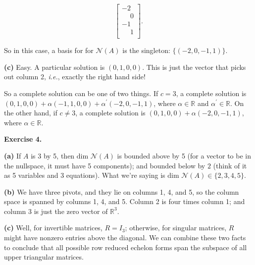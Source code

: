 \documentclass{article}
\begin{document}
\[
\begin{bmatrix}
-2\\
\phantom{-}0\\
-1\\
\phantom{-}1\\
\end{bmatrix}.
\]

So in this case, a basis for for $\mathcal{N}(A)$ is the singleton: $\{(-2, 0, -1, 1)\}$.

\noindent \textbf{(c)} Easy. A particular solution is $(0, 1, 0, 0)$. This is just the vector that picks out column 2, \textit{i.e.}, exactly the right hand side!

So a complete solution can be one of two things. If $c = 3$, a complete solution is $(0, 1, 0, 0) + \alpha (-1, 1, 0, 0) + \alpha^{\prime} (-2, 0, -1, 1)$, where $\alpha \in \mathbb{R}$ and $\alpha^{\prime} \in \mathbb{R}$. On the other hand, if $c \neq 3$, a complete solution is $(0, 1, 0, 0) + \alpha (-2, 0, -1, 1)$, where $\alpha \in \mathbb{R}$.

\noindent \textbf{Exercise 4.}

\noindent \textbf{(a)} If $A$ is 3 by 5, then $\text{dim }\mathcal{N}(A)$ is bounded above by 5 (for a vector to be in the nullspace, it must have 5 components); and bounded below by $2$ (think of it as 5 variables and 3 equations). What we're saying is $\text{dim }\mathcal{N}(A) \in \{2, 3, 4, 5\}$.

\noindent \textbf{(b)} We have three pivots, and they lie on columns 1, 4, and 5, so the column space is spanned by columns 1, 4, and 5. Column 2 is four times column 1; and column 3 is just the zero vector of $\mathbb{R}^{3}$.

\noindent \textbf{(c)} Well, for invertible matrices, $R = I_3$; otherwise, for singular matrices, $R$ might have nonzero entries above the diagonal. We can combine these two facts to conclude that all possible row reduced echelon forms span the subspace of all upper triangular matrices.
\end{document}
